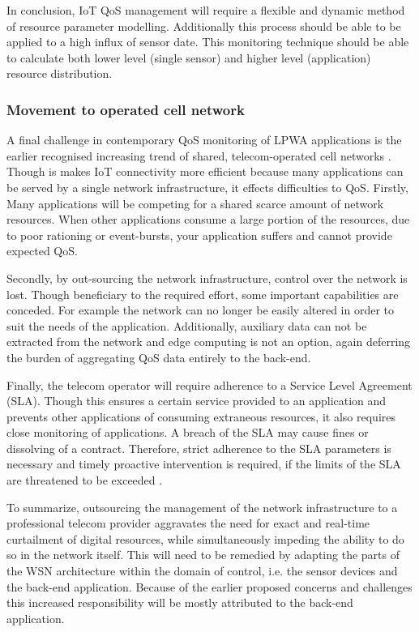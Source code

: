 In conclusion, IoT QoS management will require a flexible and dynamic method of resource parameter modelling. Additionally this process should be able to be applied to a high influx of sensor date. This monitoring technique should be able to calculate both lower level (single sensor) and higher level (application) resource distribution.

\subsubsection{Movement to operated cell network}
A final challenge in contemporary QoS monitoring of LPWA applications is the earlier recognised increasing trend of shared, telecom-operated cell networks \cite{tmobile, vodafone}. Though is makes IoT connectivity more efficient because many applications can be served by a single network infrastructure, it  effects difficulties to QoS. Firstly, Many applications will be competing for a shared scarce amount of network resources. When other applications consume a large portion of the resources, due to poor rationing or event-bursts, your application suffers and cannot provide expected QoS.

Secondly, by out-sourcing the network infrastructure, control over the network is lost. Though beneficiary to the required effort, some important capabilities are conceded. For example the network can no longer be easily altered in order to suit the needs of the application. Additionally, auxiliary data can not be extracted from the network and edge computing is not an option, again deferring the burden of aggregating QoS data entirely to the back-end.

Finally, the telecom operator will require adherence to a Service Level Agreement (SLA). Though this ensures a certain service provided to an application and prevents other applications of consuming extraneous resources, it also requires close monitoring of applications. A breach of the SLA may cause fines or dissolving of a contract. Therefore, strict adherence to the SLA parameters is necessary and timely proactive intervention is required, if the limits of the SLA are threatened to be exceeded \cite{cloud_computing_monitoring}.

To summarize, outsourcing the management of the network infrastructure to a professional telecom provider aggravates the need for exact and real-time curtailment of digital resources, while simultaneously impeding the ability to do so in the network itself. This will need to be remedied by adapting the parts of the WSN architecture within the domain of control, i.e. the sensor devices and the back-end application. Because of the earlier proposed concerns and challenges this increased responsibility will be mostly attributed to the back-end application.

